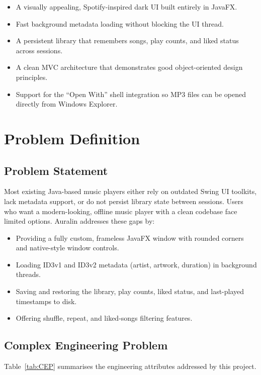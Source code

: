 ﻿\documentclass[12pt]{report}
\begin{document}
\begin{itemize}
    \item A visually appealing, Spotify-inspired dark UI built entirely in JavaFX.
    \item Fast background metadata loading without blocking the UI thread.
    \item A persistent library that remembers songs, play counts, and liked status across sessions.
    \item A clean MVC architecture that demonstrates good object-oriented design principles.
    \item Support for the ``Open With'' shell integration so MP3 files can be opened directly from Windows Explorer.
\end{itemize}

\section{Problem Definition}

\subsection{Problem Statement}
Most existing Java-based music players either rely on outdated Swing UI toolkits, lack metadata support, or do not persist library state between sessions. Users who want a modern-looking, offline music player with a clean codebase face limited options. Auralin addresses these gaps by:

\begin{itemize}
    \item Providing a fully custom, frameless JavaFX window with rounded corners and native-style window controls.
    \item Loading ID3v1 and ID3v2 metadata (artist, artwork, duration) in background threads.
    \item Saving and restoring the library, play counts, liked status, and last-played timestamps to disk.
    \item Offering shuffle, repeat, and liked-songs filtering features.
\end{itemize}

\subsection{Complex Engineering Problem}
Table~\ref{tab:CEP} summarises the engineering attributes addressed by this project.
\end{document}
